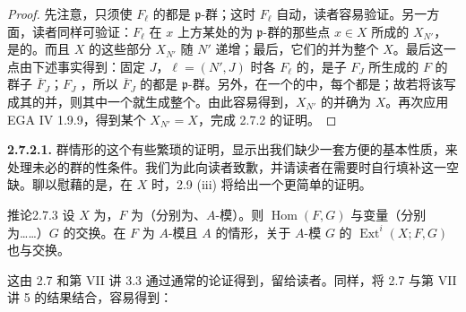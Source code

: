 \begin{proof}
先注意，只须使 $F_\ell$ 的都是 $\mathfrak p$-群；这时 $F_\ell$ 自动，读者容易验证。另一方面，读者同样可验证：$F_\ell$ 在 $x$ 上方某处的为 $\mathfrak p$-群的那些点 $x\in X$ 所成的 $X_{N'}$，是的。而且 $X$ 的这些部分 $X_{N'}$ 随 $N'$ 递增；最后，它们的并为整个 $X$。最后这一点由下述事实得到：固定 $J$，$\ell=(N',J)$ 时各 $F_\ell$ 的，是子 $F_J$ 所生成的 $F$ 的群子 $\overline F_J$；$F_J$ ，所以 $\overline F_J$ 的都是 $\mathfrak p$-群。另外，在一个的中，每个都是；故若将该写成其的并，则其中一个就生成整个。由此容易得到，$X_{N'}$ 的并确为 $X$。再次应用 EGA IV 1.9.9，得到某个 $X_{N'}=X$，完成 2.7.2 的证明。
\end{proof}
\textbf{2.7.2.1.} 群情形的这个有些繁琐的证明，显示出我们缺少一套方便的基本性质，来处理未必的群的性条件。我们为此向读者致歉，并请读者在需要时自行填补这一空缺。聊以慰藉的是，在 $X$ 时，2.9 (iii) 将给出一个更简单的证明。
\begin{SGAresult}{推论}{2.7.3}
设 $X$ 为，$F$ 为（分别为、$A$-模）。则 $\operatorname{Hom}(F,G)$ 与变量（分别为……）$G$ 的交换。在 $F$ 为 $A$-模且 $A$ 的情形，关于 $A$-模 $G$ 的 $\operatorname{Ext}^i(X;F,G)$ 也与交换。
\end{SGAresult}
这由 2.7 和第 VII 讲 3.3 通过通常的论证得到，留给读者。同样，将 2.7 与第 VII 讲 5 的结果结合，容易得到：

